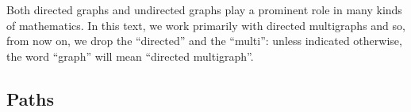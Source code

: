 
Both directed graphs and undirected graphs play a prominent role in many kinds of mathematics.
In this text, we work primarily with directed multigraphs and so, from now on, we drop the ``directed'' and the ``multi'': unless indicated otherwise, the word ``graph'' will mean ``directed multigraph''.



\subsection{Paths}

